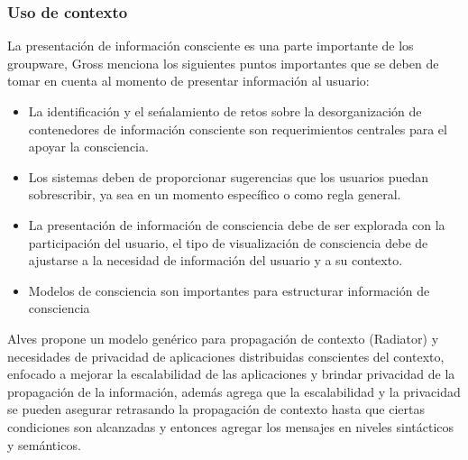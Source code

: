 \subsubsection{Uso de contexto}
La presentaci\'on de informaci\'on consciente es una parte importante de los groupware, Gross\cite{gross2013supporting} menciona los siguientes puntos importantes que se deben de tomar en cuenta al momento de presentar informaci\'on al usuario:
\begin{itemize}
\item La identificaci\'on y el se\'nalamiento de retos sobre la desorganizaci\'on de contenedores de informaci\'on consciente son requerimientos centrales para el apoyar la consciencia.
\item Los sistemas deben de proporcionar sugerencias que los usuarios puedan sobrescribir, ya sea en un momento espec\'ifico o como regla general.
\item La presentaci\'on de informaci\'on de consciencia debe de ser explorada con la participaci\'on del usuario, el tipo de visualizaci\'on de consciencia debe de ajustarse a la necesidad de informaci\'on del usuario y a su contexto.
\item Modelos de consciencia son importantes para estructurar informaci\'on de consciencia
\end{itemize}
Alves \cite{alves2013radiator} propone un modelo gen\'erico para propagaci\'on de contexto (Radiator) y necesidades de privacidad de aplicaciones distribuidas conscientes del contexto, enfocado a mejorar la escalabilidad de las aplicaciones y brindar privacidad de la propagaci\'on de la informaci\'on, adem\'as agrega que la escalabilidad y la privacidad se pueden asegurar retrasando la propagaci\'on de contexto hasta que ciertas condiciones son alcanzadas y entonces agregar los mensajes en niveles sint\'acticos y sem\'anticos.

